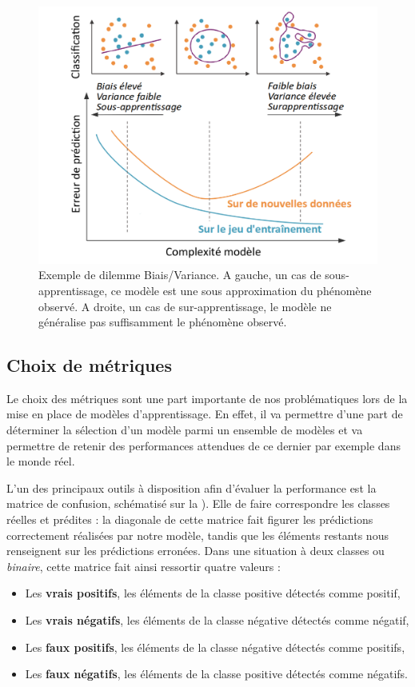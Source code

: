 \begin{figure}[H]
    \centering
    \includegraphics[width=0.8\linewidth]{contents/chapter_3/resources/example_underfit_overfit.pdf}
    \caption{Exemple de dilemme Biais/Variance. A gauche, un cas de sous-apprentissage, ce modèle est une sous approximation du phénomène observé. A droite, un cas de sur-apprentissage, le modèle ne généralise pas suffisamment le phénomène observé.}
    \label{fig:example_underfit_overfit}
\end{figure}

\subsection{Choix de métriques}
\label{subsec:metrics}
Le choix des métriques sont une part importante de nos problématiques lors de la mise en place de modèles d’apprentissage. En effet, il va permettre d'une part de déterminer la sélection d'un modèle parmi un ensemble de modèles et va permettre de retenir des performances attendues de ce dernier par exemple dans le monde réel.\par

L’un des principaux outils à disposition afin d'évaluer la performance est la matrice de confusion, schématisé sur la ). Elle de faire correspondre les classes réelles et prédites : la diagonale de cette matrice fait figurer les prédictions correctement réalisées par notre modèle, tandis que les éléments restants nous renseignent sur les prédictions erronées. Dans une situation à deux classes ou \textit{binaire}, cette matrice fait ainsi ressortir quatre valeurs :
\begin{itemize}
	\item Les \textbf{vrais positifs}, les éléments de la classe positive détectés comme positif,
	\item Les \textbf{vrais négatifs}, les éléments de la classe négative détectés comme négatif,
	\item Les \textbf{faux positifs}, les éléments de la classe négative détectés comme positifs,
	\item Les \textbf{faux négatifs}, les éléments de la classe positive détectés comme négatifs.
\end{itemize}\par

